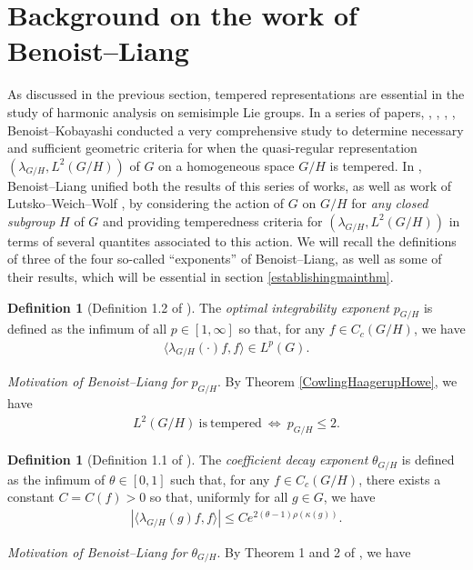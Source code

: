 \documentclass[psamsfonts]{amsart}
\theoremstyle{definition}
\newtheorem{defn}[thm]{Definition}
\theoremstyle{remark}
\numberwithin{equation}{section}
\begin{document}
\section{Background on the work of Benoist--Liang}
\label{BackgrounonBenoist--Liang}
As discussed in the previous section, tempered representations are essential in the study of harmonic analysis on semisimple Lie groups. In a series of papers, \cite{BK1}, \cite{BK2}, \cite{BK3}, \cite{BK4}, Benoist--Kobayashi conducted a very comprehensive study to determine necessary and sufficient geometric criteria for when the quasi-regular representation $(\lambda_{G/H}, L^2(G/H))$ of $G$ on a homogeneous space $G/H$ is tempered. In \cite{BL}, Benoist--Liang unified both the results of this series of works, as well as work of Lutsko--Weich--Wolf \cite{LWW}, by considering the action of $G$ on $G/H$ for \emph{any closed subgroup} $H$ of $G$ and providing temperedness criteria for $(\lambda_{G/H}, L^2(G/H))$ in terms of several quantites associated to this action. We will recall the definitions of three of the four so-called ``exponents'' of Benoist--Liang, as well as some of their results, which will be essential in section \ref{establishingmainthm}.
\begin{defn} [Definition 1.2 of \cite{BL}]
The \emph{optimal integrability exponent} $p_{G/H}$ is defined as the infimum of all $p \in [1, \infty]$ so that, for any $f \in C_{c}(G/H)$, we have 
\begin{align*}
\langle \lambda_{G/H}(\cdot) f, f \rangle \in L^{p}(G).
\end{align*}
\end{defn}
\emph{Motivation of Benoist--Liang for} $p_{G/H}$. By Theorem \ref{CowlingHaagerupHowe}, we have
\begin{align}
\label{equiv1}
L^2(G/H) \ \mathrm{is \ tempered} \ \Longleftrightarrow \ p_{G/H} \leq 2.
\end{align}
\begin{defn} [Definition 1.1 of \cite{BL}]
The \emph{coefficient decay exponent} $\theta_{G/H}$ is defined as the infimum of $\theta \in [0,1]$ such that, for any $f \in C_{c}(G/H)$, there exists a constant $C = C(f) > 0$ so that, uniformly for all $g \in G$, we have
\begin{align*}
| \langle \lambda_{G/H}(g)f,f \rangle | \leq C e^{2(\theta - 1) \rho(\kappa(g))}.  
\end{align*}
\end{defn} 
\emph{Motivation of Benoist--Liang for} $\theta_{G/H}$. By Theorem 1 and 2 of \cite{CHH}, we have
\end{document}
